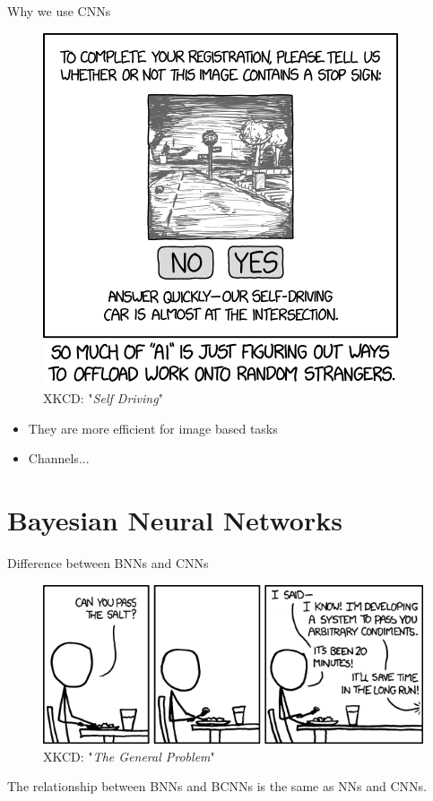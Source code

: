 \documentclass{beamer}
\begin{document}
\begin{frame}{Why we use CNNs}
	\begin{multicols}{2}
		\begin{figure}
			\includegraphics[width=.45\textwidth]{../Images/xkcd_self_driving.png}
			\caption{XKCD: "\textit{Self Driving}" \cite{xkcd-self-driving}}
		\end{figure}
		
		\columnbreak
		
		\null \vfill
		\begin{itemize}
			\item They are more efficient for image based tasks
			\item Channels...
		\end{itemize}
		\vfill \null
	\end{multicols}
\end{frame}

\section{Bayesian Neural Networks}

\begin{frame}{Difference between BNNs and CNNs}
	\begin{figure}
		\includegraphics[width=.75\textwidth]{../Images/the_general_problem.png}
		\caption{ XKCD: "\textit{The General Problem}" \cite{xkcd-general-problem}}
	\end{figure}
		The relationship between BNNs and BCNNs is the same as NNs and CNNs.
\end{frame}
\end{document}
